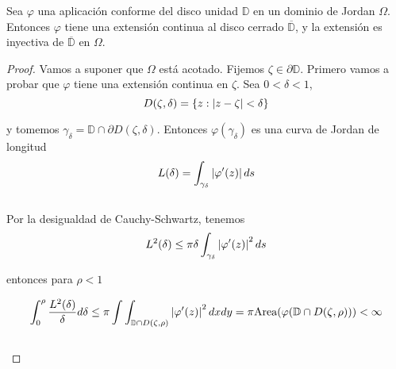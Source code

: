 \bigskip

\begin{theorem}
    Sea $\varphi$ una aplicación conforme del disco unidad $\mathbb{D}$ en un dominio de Jordan $\Omega$. Entonces $\varphi$ tiene una extensión continua al disco cerrado $\overline{\mathbb{D}}$, y la extensión es inyectiva de $\overline{\mathbb{D}}$ en $\Omega$.
\end{theorem}

\begin{proof}
    Vamos a suponer que $\Omega$ está acotado. Fijemos $\zeta \in \partial \mathbb{D}$. Primero vamos a probar que $\varphi$ tiene una extensión continua en $\zeta$. Sea $0 < \delta < 1$,
    \begin{equation*}
        D(\zeta, \delta) = \{z: \left\lvert z - \zeta\right\rvert < \delta \}
    \end{equation*}

    y tomemos $\gamma_{\delta} = \mathbb{D} \cap \partial D(\zeta, \delta)$. Entonces $\varphi (\gamma_{\delta})$ es una curva de Jordan de longitud
    \begin{equation*}
        L(\delta) = \int_{\gamma_{\delta}} \left\lvert\varphi ' (z)\right\rvert ds
    \end{equation*}
    \\
    Por la desigualdad de Cauchy-Schwartz, tenemos
    \begin{equation*}
        L^2(\delta) \leq \pi \delta \int_{\gamma_{\delta}} \left\lvert\varphi ' (z)\right\rvert^2 ds
    \end{equation*}

    entonces para $\rho < 1$

    \begin{equation*}
        \int_{0}^{\rho} \frac{L^2(\delta)}{\delta} d\delta \leq \pi \int \int_{\mathbb{D} \cap D(\zeta, \rho)} \left\lvert\varphi ' (z)\right\rvert^2 dxdy = \pi \text{Area}(\varphi(\mathbb{D} \cap D(\zeta, \rho))) < \infty
    \end{equation*}
    \\


\end{proof}
